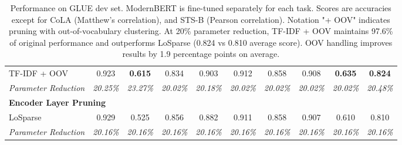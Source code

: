 \begin{table*}[h]
\begin{tabular}{l@{\hspace{25pt}}ccccccccc}
TF-IDF + OOV & 0.923 & \textbf{0.615} & 0.834 & 0.903 & 0.912 & 0.858 & 0.908 & \textbf{0.635} & \textbf{0.824} \\
\textit{Parameter Reduction} & \textit{20.25\%} & \textit{23.27\%} & \textit{20.02\%} & \textit{20.18\%} & \textit{20.02\%} & \textit{20.02\%} & \textit{20.02\%} & \textit{20.02\%} & \textit{20.48\%} \\
\midrule
\multicolumn{10}{l}{\textbf{Encoder Layer Pruning}} \\
LoSparse & 0.929 & 0.525 & 0.856 & 0.882 & 0.911 & 0.858 & 0.907 & 0.610 & 0.810 \\
\textit{Parameter Reduction} & \textit{20.16\%} & \textit{20.16\%} & \textit{20.16\%} & \textit{20.16\%} & \textit{20.16\%} & \textit{20.16\%} & \textit{20.16\%} & \textit{20.16\%} & \textit{20.16\%} \\
\bottomrule
\end{tabular}
\caption{Performance on GLUE dev set. ModernBERT is fine-tuned separately for each task. Scores are accuracies except for CoLA (Matthew's correlation), and STS-B (Pearson correlation). Notation "+ OOV" indicates pruning with out-of-vocabulary clustering. At 20\% parameter reduction, TF-IDF + OOV maintains 97.6\% of original performance and outperforms LoSparse (0.824 vs 0.810 average score). OOV handling improves results by 1.9 percentage points on average.}


\label{tab:results}
\end{table*}
